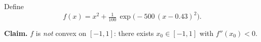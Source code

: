 \begin{problem}
Define
\[
  f(x) = x^{2} + \tfrac{1}{100}\,\exp\!\bigl(-500\,(x - 0.43)^{2}\bigr).
\]

\textbf{Claim.} $f$ is \emph{not} convex on $[-1, 1]$: there exists
$x_{0} \in [-1, 1]$ with $f''(x_{0}) < 0$.
\end{problem}

